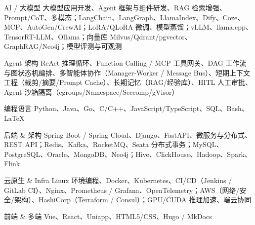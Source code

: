 
\begin{cvskills}

  \cvskill
    {AI / 大模型}
    {大模型应用开发、Agent 框架与组件研发、RAG 检索增强、Prompt/CoT、多模态；LangChain、LangGraph、LlamaIndex、Dify、Coze、MCP、AutoGen/CrewAI；LoRA/QLoRA 微调、模型蒸馏；vLLM、llama.cpp、TensorRT-LLM、Ollama；向量库 Milvus/Qdrant/pgvector、GraphRAG/Neo4j；模型评测与可观测}

  \cvskill
    {Agent 架构}
    {ReAct 推理循环、Function Calling / MCP 工具网关、DAG 工作流与图状态机编排、多智能体协作（Manager-Worker / Message Bus）、短期上下文工程（裁剪/摘要/Prompt Cache）、长期记忆（RAG/经验库）、HITL 人工审批、Agent 沙箱隔离（cgroups/Namespace/Seccomp/gVisor）}

  \cvskill
    {编程语言}
    {Python、Java、Go、C/C++、JavaScript/TypeScript、SQL、Bash、LaTeX}

  \cvskill
    {后端 \& 架构}
    {Spring Boot / Spring Cloud、Django、FastAPI、微服务与分布式、REST API；Redis、Kafka、RocketMQ、Seata 分布式事务；MySQL、PostgreSQL、Oracle、MongoDB、Neo4j；Hive、ClickHouse、Hadoop、Spark、Flink}

  \cvskill
    {云原生 \& Infra}
    {Linux 环境编程、Docker、Kubernetes、CI/CD（Jenkins / GitLab CI）、Nginx、Prometheus / Grafana、OpenTelemetry；AWS（网络/安全/架构）、HashiCorp（Terraform / Consul）；GPU/CUDA 推理加速、端云协同}

  \cvskill
    {前端 \& 多端}
    {Vue、React、Uniapp、HTML5/CSS、Hugo / MkDocs}

\end{cvskills}
